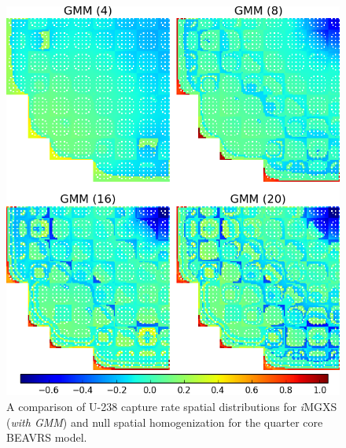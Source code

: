 \begin{figure}[h!]
\centering
\includegraphics[width=0.9\linewidth]{figures/results/compare/full-core/compare-capt-gmm}
\vspace{2mm}
\caption[U-238 capture rate comparison for the quarter core BEAVRS model]{A comparison of U-238 capture rate spatial distributions for \textit{i}\ac{MGXS} (\textit{with \ac{GMM}}) and null spatial homogenization for the quarter core BEAVRS model.}
\label{fig:chap11-assm-full-core-capt-rates-gmm-comp}
\end{figure}

\clearpage

